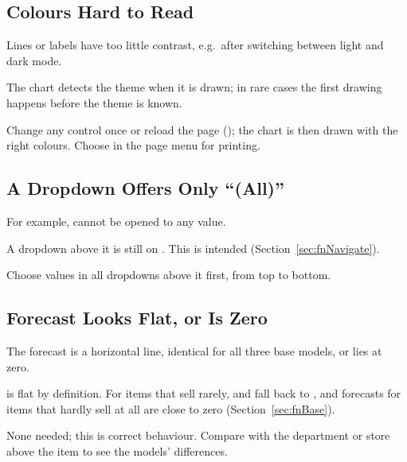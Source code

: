 \subsection{Colours Hard to Read}
\label{sec:tsTheme}

\begin{description}[style=nextline,leftmargin=0.5cm,font=\normalfont\bfseries]
  \item[Symptom] Lines or labels have too little contrast, e.g.\ after switching between light and dark mode.
  \item[Cause] The chart detects the theme when it is drawn; in rare cases the first drawing happens before the theme is known.
  \item[Solution] Change any control once or reload the page (); the chart is then drawn with the right colours. Choose  in the page menu for printing.
\end{description}

\subsection{A Dropdown Offers Only ``(All)''}
\label{sec:tsLocked}

\begin{description}[style=nextline,leftmargin=0.5cm,font=\normalfont\bfseries]
  \item[Symptom] For example,  cannot be opened to any value.
  \item[Cause] A dropdown above it is still on . This is intended (Section~\ref{sec:fnNavigate}).
  \item[Solution] Choose values in all dropdowns above it first, from top to bottom.
\end{description}

\subsection{Forecast Looks Flat, or Is Zero}
\label{sec:tsFlat}

\begin{description}[style=nextline,leftmargin=0.5cm,font=\normalfont\bfseries]
  \item[Symptom] The forecast is a horizontal line, identical for all three base models, or lies at zero.
  \item[Cause]  is flat by definition. For items that sell rarely,  and  fall back to , and forecasts for items that hardly sell at all are close to zero (Section~\ref{sec:fnBase}).
  \item[Solution] None needed; this is correct behaviour. Compare with the department or store above the item to see the models' differences.
\end{description}

